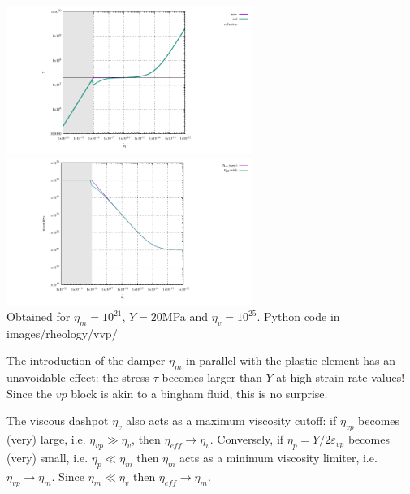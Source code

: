 \begin{itemize}
\begin{center}
\includegraphics[width=8cm]{images/rheology/vvp/tau_comp.pdf}
\includegraphics[width=8cm]{images/rheology/vvp/viscosities_comp.pdf}\\
{\captionfont Obtained for $\eta_m=10^{21}$, $Y=20$MPa and $\eta_v=10^{25}$. Python code 
in images/rheology/vvp/}
\end{center}

\begin{remark}
The introduction of the damper $\eta_m$ in parallel with the plastic element has an unavoidable
effect: the stress $\tau$ becomes larger than $Y$ at high strain rate values! Since the $vp$ 
block is akin to a bingham fluid, this is no surprise.
\end{remark}

\begin{remark}
The viscous dashpot $\eta_v$ also acts as a maximum viscosity cutoff: if $\eta_{vp}$ becomes (very) large, i.e. $\eta_{vp} \gg \eta_v$, then $\eta_{eff} \rightarrow \eta_v$.
Conversely, if $\eta_p=Y/2\dot\varepsilon_{vp}$ becomes (very) small, i.e. $\eta_p \ll \eta_m$ then $\eta_m$ acts as a minimum viscosity limiter, i.e. $\eta_{vp} \rightarrow \eta_m$. 
Since $\eta_m \ll \eta_v$ then $\eta_{eff} \rightarrow \eta_m$.
\end{remark}


\end{itemize}
